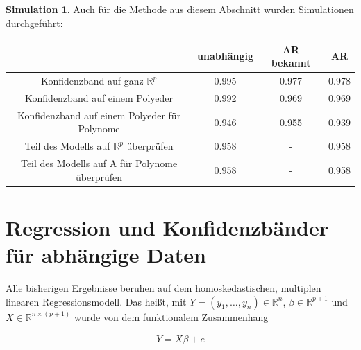 \documentclass[12pt,a4paper]{article}
\theoremstyle{definition}
\theoremstyle{definition}
\theoremstyle{definition}
\newtheorem{Simulation}[Definition]{Simulation}
\theoremstyle{definition}
\newcommand{\UeberRR}{0.995}
\newcommand{\UeberRMinmax}{0.992}
\newcommand{\UeberRMinmaxPolyfast}{0.946}
\newcommand{\UeberARbekanntR}{0.977}
\newcommand{\UeberARbekanntMinmax}{0.969}
\newcommand{\UeberARbekanntMinmaxPolyfast}{0.955}
\newcommand{\UeberARR}{0.978}
\newcommand{\UeberARMinmax}{0.969}
\newcommand{\UeberARMinmaxPolyfast}{0.939}
\newcommand{\UeberRRpruefen}{0.958}
\newcommand{\UeberRMinmaxPolyfastpruefen}{0.958}
\newcommand{\UeberARbekanntRpruefen}{-}
\newcommand{\UeberARbekanntMinmaxPolyfastpruefen}{-}
\newcommand{\UeberARRpruefen}{0.958}
\newcommand{\UeberARMinmaxPolyfastpruefen}{0.958}
\begin{document}
\begin{Simulation}
Auch für die Methode aus diesem Abschnitt wurden Simulationen durchgeführt:

\begin{center}
\begin{tabular}{|c|c|c|c|}
\hline 
& unabhängig & AR bekannt & AR \\ 
\hline 
Konfidenzband auf ganz $\mathbb{R}^{p}$		 & \UeberRR		  & \UeberARbekanntR & \UeberARR \\ 
\hline 
Konfidenzband auf einem Polyeder	 & \UeberRMinmax  & \UeberARbekanntMinmax & \UeberARMinmax \\ 
\hline 
Konfidenzband auf einem Polyeder für Polynome  & \UeberRMinmaxPolyfast & \UeberARbekanntMinmaxPolyfast & \UeberARMinmaxPolyfast \\ 
\hline 
Teil des Modells auf $\mathbb{R}^{p}$ überprüfen 	& \UeberRRpruefen & \UeberARbekanntRpruefen & \UeberARRpruefen \\ 
\hline 
Teil des Modells auf A für Polynome überprüfen	& \UeberRMinmaxPolyfastpruefen & \UeberARbekanntMinmaxPolyfastpruefen & \UeberARMinmaxPolyfastpruefen \\ 
\hline 
\end{tabular} 
\end{center}

\end{Simulation}





\newpage
\section{Regression und Konfidenzbänder für abhängige Daten}
\label{Regression und Konfidenzbänder für abhaengige Daten}
Alle bisherigen Ergebnisse beruhen auf dem homoskedastischen, multiplen linearen Regressionsmodell. Das heißt, mit $Y=(y_1, \ldots, y_n) \in \mathbb{R}^n$, $\beta \in \mathbb{R}^{p+1}$ und $X \in \mathbb{R}^{n \times (p+1)}$ wurde von dem funktionalem Zusammenhang

\begin{align} \label{Grundmodell_AR}
Y = X \beta + e
\end{align}
\end{document}
